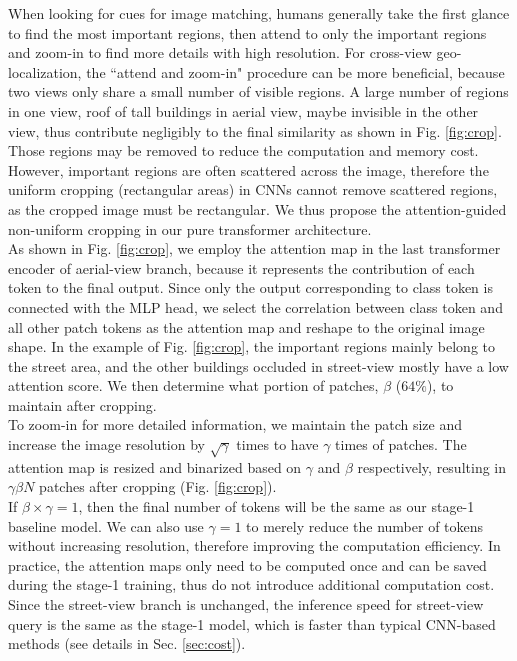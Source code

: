 \documentclass[10pt,twocolumn,letterpaper]{article}
\begin{document}
When looking for cues for image matching, humans generally take the first glance to find the most important regions, then attend to only the important regions and zoom-in to find more details with high resolution. For cross-view geo-localization, the ``attend and zoom-in" procedure can be more beneficial, because two views only share a small number of visible regions. A large number of regions in one view, \eg roof of tall buildings in aerial view, maybe invisible in the other view, thus  contribute negligibly to the final similarity as shown in Fig. \ref{fig:crop}. Those regions may be removed to reduce the computation and memory cost. However, important regions are often scattered across the image, therefore the uniform cropping (\ie rectangular areas) in CNNs cannot remove scattered regions, as the cropped image must be rectangular. We thus propose the attention-guided non-uniform cropping 
in our pure transformer architecture. \\
\indent As shown in Fig. \ref{fig:crop}, we employ the attention map in the last  transformer encoder of aerial-view branch, because it represents the contribution of each token to the final output. Since only the output corresponding to class token is connected with the MLP head, we select the correlation between class token and all other patch tokens as the attention map and reshape to the original image shape. In the example of Fig. \ref{fig:crop}, the important regions mainly belong to the street area, and the other buildings occluded in street-view mostly have a low attention score. We then determine what portion of patches, $\beta$ (\eg $64\%$), to maintain after cropping. \\
\indent To zoom-in for more detailed information, we maintain the patch size  and increase the image resolution by $\sqrt{\gamma}$ times to have $\gamma$ times of patches. The attention map is resized and binarized based on $\gamma$ and $\beta$ respectively, resulting in $\gamma\beta N$ patches after cropping (Fig. \ref{fig:crop}).   \\
\indent If $\beta \times \gamma =1$, then the final number of tokens will be the same as our stage-1 baseline model. We can also use $\gamma = 1$ to merely reduce the number of tokens without increasing resolution, therefore improving the computation efficiency. 
In practice, the attention maps only need to be computed once and can be saved during the stage-1 training, thus do not introduce additional computation cost. Since the street-view branch is unchanged, the inference speed for street-view query is the same as the stage-1 model, which is faster than typical CNN-based methods (see details in Sec. \ref{sec:cost}).
\end{document}
